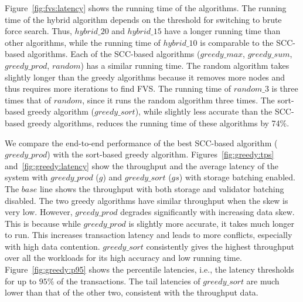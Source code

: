 Figure~\ref{fig:fvs:latency} shows the running time of the algorithms. The running time of the hybrid algorithm depends on the threshold for switching to brute force search. Thus, $hybrid\_20$ and $hybrid\_15$ have a longer running time than other algorithms, while the running time of $hybrid\_10$ is comparable to the SCC-based algorithms. Each of the SCC-based algorithms ($greedy\_max$, $greedy\_sum$, $greedy\_prod$, $random$) has a similar running time. The random algorithm takes slightly longer than the greedy algorithms because it removes more nodes and thus requires more iterations to find FVS. The running time of $random\_3$ is three times that of $random$, since it runs the random algorithm three times. The sort-based greedy algorithm ($greedy\_sort$), while slightly less accurate than the SCC-based greedy algorithms, reduces the running time of these algorithms by 74\%. 

We compare the end-to-end performance of the best SCC-based algorithm ($greedy\_prod$) with the sort-based greedy algorithm. Figures~\ref{fig:greedy:tps} and~\ref{fig:greedy:latency} show the throughput and the average latency of the system with $greedy\_prod$ ($g$) and $greedy\_sort$ ($gs$) with storage batching enabled. The $base$ line shows the throughput with both storage and validator batching disabled. 
The two greedy algorithms have similar throughput when the skew is very low. However, $greedy\_prod$ degrades significantly with increasing data skew. This is because while $greedy\_prod$ is slightly more accurate, it takes much longer to run. This increases transaction latency and leads to more conflicts, especially with high data contention. $greedy\_sort$ consistently gives the highest throughput over all the workloads for its high accuracy and low running time. 
Figure~\ref{fig:greedy:p95} shows the percentile latencies, i.e., the latency thresholds for up to $95\%$ of the transactions. The tail latencies of $greedy\_sort$ are much lower than that of the other two, consistent with the throughput data.


